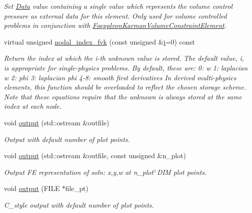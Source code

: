 \begin{DoxyCompactItemize}
\begin{DoxyCompactList}\small\item\em Set \hyperlink{classoomph_1_1Data}{Data} value containing a single value which represents the volume control pressure as external data for this element. Only used for volume controlled problems in conjunction with \hyperlink{classoomph_1_1FoepplvonKarmanVolumeConstraintElement}{Foepplvon\+Karman\+Volume\+Constraint\+Element}. \end{DoxyCompactList}\item 
virtual unsigned \hyperlink{classoomph_1_1FoepplvonKarmanEquations_a95dc0adb56100493104ba426fa3daa04}{nodal\+\_\+index\+\_\+fvk} (const unsigned \&\hyperlink{cfortran_8h_adb50e893b86b3e55e751a42eab3cba82}{i}=0) const
\begin{DoxyCompactList}\small\item\em Return the index at which the i-\/th unknown value is stored. The default value, i, is appropriate for single-\/physics problems. By default, these are\+: 0\+: w 1\+: laplacian w 2\+: phi 3\+: laplacian phi 4-\/8\+: smooth first derivatives In derived multi-\/physics elements, this function should be overloaded to reflect the chosen storage scheme. Note that these equations require that the unknown is always stored at the same index at each node. \end{DoxyCompactList}\item 
void \hyperlink{classoomph_1_1FoepplvonKarmanEquations_a44739d9c804206ea60671b0de07ad154}{output} (std\+::ostream \&outfile)
\begin{DoxyCompactList}\small\item\em Output with default number of plot points. \end{DoxyCompactList}\item 
void \hyperlink{classoomph_1_1FoepplvonKarmanEquations_aa97cf4d70c7c059e6cb38557282156a5}{output} (std\+::ostream \&outfile, const unsigned \&n\+\_\+plot)
\begin{DoxyCompactList}\small\item\em Output FE representation of soln\+: x,y,w at n\+\_\+plot$^\wedge$\+D\+IM plot points. \end{DoxyCompactList}\item 
void \hyperlink{classoomph_1_1FoepplvonKarmanEquations_a19d1540525a0c822c059ce50989710a6}{output} (F\+I\+LE $\ast$file\+\_\+pt)
\begin{DoxyCompactList}\small\item\em C\+\_\+style output with default number of plot points. \end{DoxyCompactList}\item 

\end{DoxyCompactItemize}
